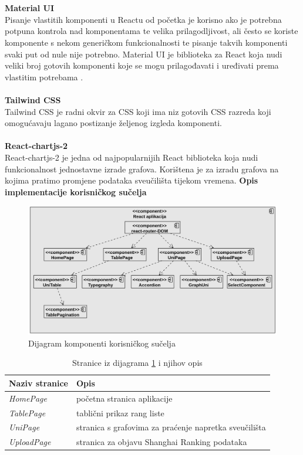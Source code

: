 \documentclass[times, utf8, zavrsni]{fer}
\begin{document}
\\
\\ \textbf{Material UI}
\\ Pisanje vlastitih komponenti u Reactu od početka je korisno ako je potrebna potpuna kontrola nad komponentama te velika prilagodljivost, ali
često se koriste komponente s nekom generičkom funkcionalnosti te pisanje takvih komponenti svaki put od nule nije potrebno. 
Material UI je biblioteka za React koja nudi veliki broj gotovih komponenti koje se mogu prilagođavati i uređivati prema vlastitim potrebama .
\\
\\ \textbf{Tailwind CSS}
\\ Tailwind CSS je radni okvir  za CSS  koji ima niz gotovih CSS razreda koji omogućavaju lagano postizanje 
željenog izgleda komponenti.
\\
\\ \textbf{React-chartjs-2}
\\ React-chartjs-2 je jedna od najpopularnijih React biblioteka koja nudi funkcionalnost jednostavne izrade grafova. Korištena je za izradu grafova na 
kojima pratimo promjene podataka sveučilišta tijekom vremena.
\newpage\textbf{Opis implementacije korisničkog sučelja}
\begin{figure}[htb]
    \hspace{-1.3cm}
       \includegraphics[scale=0.35]{reactkomponente.png} 
       \caption{Dijagram komponenti korisničkog sučelja}
       \label{fig:reactkomponente}
       \end{figure}
       \begin{table}[htb]
        \caption{Stranice iz dijagrama \ref{fig:reactkomponente} i njihov opis}
            \label{tbl:stranice}
            \centering
            \begin{tabular}{ll} \hline
            Naziv stranice & Opis\\ \hline
            \emph{HomePage} & početna stranica aplikacije\\
            \emph{TablePage} & tablični prikaz rang liste\\
            \emph{UniPage} & stranica s grafovima za praćenje napretka sveučilišta\\
            \emph{UploadPage} & stranica za objavu Shanghai Ranking podataka
            \end{tabular} 
            \end{table} 
\end{document}
